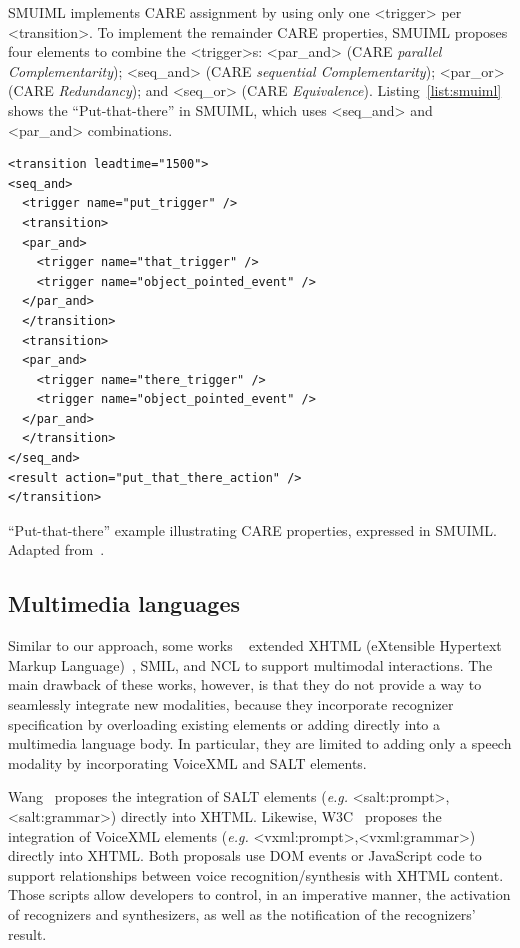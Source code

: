 \documentclass[
  doutorado,
  american
]{ThesisPUC}
\newcommand{\lis}[1]{Listing~\ref{#1}}
\begin{document}
SMUIML implements CARE assignment by using only one <trigger> per <transition>.
To implement the remainder CARE properties, SMUIML proposes four elements to
combine the <trigger>s: <par\_and> (CARE \textit{parallel Complementarity});
<seq\_and> (CARE \textit{sequential Complementarity}); <par\_or> (CARE
\textit{Redundancy}); and <seq\_or> (CARE \textit{Equivalence}). 
\lis{list:smuiml} shows the “Put-that-there” in SMUIML, which uses <seq\_and> 
and <par\_and> combinations.

\begin{listing}
\begin{verbatim}
<transition leadtime="1500">
<seq_and>
  <trigger name="put_trigger" />
  <transition>
  <par_and>
    <trigger name="that_trigger" />
    <trigger name="object_pointed_event" />
  </par_and>
  </transition>
  <transition>
  <par_and>
    <trigger name="there_trigger" />
    <trigger name="object_pointed_event" />
  </par_and>
  </transition>
</seq_and>
<result action="put_that_there_action" />
</transition>
\end{verbatim}
\caption[“Put-that-there” expressed in SMUIML.]{“Put-that-there” example 
illustrating CARE properties, expressed in 
SMUIML. Adapted from~\cite{dumas_frameworks_2010}.}
\label{list:smuiml}
\end{listing}

\subsection{Multimedia languages}
\label{sec:state:multimedia}

Similar to our approach, some works
~\cite{beckham_towards_2001,carvalho_architectures_2008,
carvalho_estendendo_2010,	w3c_xhtml+voice_2001,wang_salt:_2002} extended XHTML
(eXtensible Hypertext Markup Language)~\cite{w3c_xhtml_2000}, SMIL, and NCL to
support multimodal interactions. The main drawback of these works, however, is
that they do not provide a way to seamlessly integrate new modalities, because
they incorporate recognizer specification by overloading existing elements or
adding directly into a multimedia language body. In particular, they are limited
to adding only a speech modality by incorporating VoiceXML and SALT elements.

Wang~\cite{wang_salt:_2002} proposes the integration of SALT elements
(\textit{e.g.} <salt:prompt>, <salt:grammar>) directly into XHTML. Likewise, 
W3C~\cite{w3c_xhtml+voice_2001} proposes the integration of VoiceXML elements
(\textit{e.g.} <vxml:prompt>,<vxml:grammar>) directly into XHTML. Both proposals
use DOM events or JavaScript code to support relationships between voice
recognition/synthesis with XHTML content. Those scripts allow developers to
control, in an imperative manner, the activation of recognizers and
synthesizers, as well as the notification of the recognizers’ result.
\end{document}
